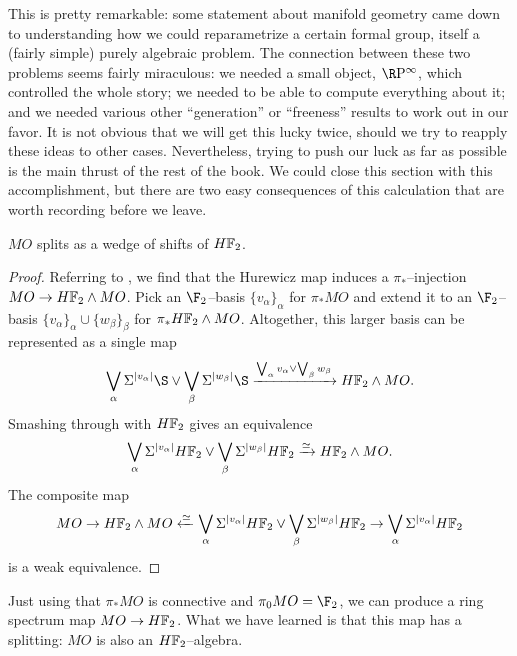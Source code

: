 This is pretty remarkable: some statement about manifold geometry came down to understanding how we could reparametrize a certain formal group, itself a (fairly simple) purely algebraic problem.  The connection between these two problems seems fairly miraculous: we needed a small object, $\RP^\infty$, which controlled the whole story; we needed to be able to compute everything about it; and we needed various other ``generation'' or ``freeness'' results to work out in our favor.  It is not obvious that we will get this lucky twice, should we try to reapply these ideas to other cases.  Nevertheless, trying to push our luck as far as possible is the main thrust of the rest of the book.  We could close this section with this accomplishment, but there are two easy consequences of this calculation that are worth recording before we leave.

\begin{lemma}\label{MOSplitsIntoHF2s}
$MO$ splits as a wedge of shifts of $\HFtwo$.
\end{lemma}
\begin{proof}
Referring to , we find that the Hurewicz map induces a $\pi_*$--injection $MO \to \HFtwo \sm MO$.  Pick an $\F_2$--basis $\{v_\alpha\}_\alpha$ for $\pi_* MO$ and extend it to an $\F_2$--basis $\{v_\alpha\}_\alpha \cup \{w_\beta\}_\beta$ for $\pi_* \HFtwo \sm MO$.  Altogether, this larger basis can be represented as a single map \[\bigvee_\alpha \Susp^{|v_\alpha|} \S \vee \bigvee_\beta \Susp^{|w_\beta|} \S \xrightarrow{\bigvee_\alpha v_\alpha \vee \bigvee_\beta w_\beta} \HFtwo \sm MO.\]  Smashing through with $\HFtwo$ gives an equivalence \[\bigvee_\alpha \Susp^{|v_\alpha|} \HFtwo \vee \bigvee_\beta \Susp^{|w_\beta|} \HFtwo \xrightarrow\simeq \HFtwo \sm MO.\]  The composite map \[MO \to \HFtwo \sm MO \xleftarrow\simeq \bigvee_\alpha \Susp^{|v_\alpha|} \HFtwo \vee \bigvee_\beta \Susp^{|w_\beta|} \HFtwo \to \bigvee_\alpha \Susp^{|v_\alpha|} \HFtwo\] is a weak equivalence.
\end{proof}

\begin{remark}
Just using that $\pi_* MO$ is connective and $\pi_0 MO = \F_2$, we can produce a ring spectrum map $MO \to \HFtwo$.  What we have learned is that this map has a splitting: $MO$ is also an $\HFtwo$--algebra.
\end{remark}

